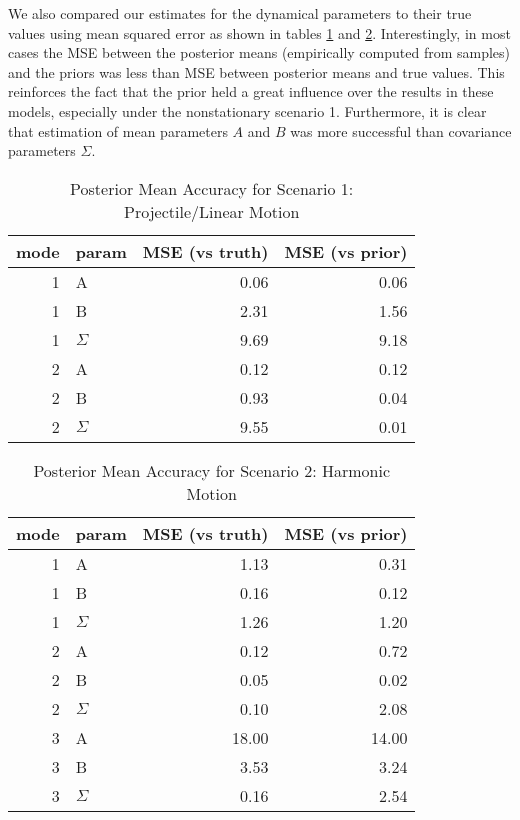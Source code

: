 \documentclass{article} %
\begin{document}
We also compared our estimates for the dynamical parameters to their true values using mean squared error as shown in tables \ref{tbl:scen1} and \ref{tbl:scen2}. Interestingly, in most cases the MSE between the posterior means (empirically computed from samples) and the priors was less than MSE between posterior means and true values. This reinforces the fact that the prior held a great influence over the results in these models, especially under the nonstationary scenario 1. Furthermore, it is clear that estimation of mean parameters $A$ and $B$ was more successful than covariance parameters $\Sigma$.

\begin{table}[]
\centering
\caption{Posterior Mean Accuracy for Scenario 1: Projectile/Linear Motion}
\label{tbl:scen1}
\begin{tabular}{rlrr}
\hline
mode & param & MSE (vs truth) & MSE (vs prior)\\ \hline
1 & A     & 0.06      & 0.06       \\
1 & B     & 2.31      & 1.56       \\
1 & $\Sigma$ & 9.69      & 9.18       \\
2 & A     & 0.12      & 0.12       \\
2 & B     & 0.93      & 0.04       \\
2 & $\Sigma$ & 9.55      & 0.01       \\ \hline
\end{tabular}
\end{table}

\begin{table}[]
\centering
\caption{Posterior Mean Accuracy for Scenario 2: Harmonic Motion}
\label{tbl:scen2}
\begin{tabular}{rlrr}
\hline
mode & param & MSE (vs truth) & MSE (vs prior) \\ \hline
1    & A     & 1.13      & 0.31       \\
1    & B     & 0.16      & 0.12       \\
1    & $\Sigma$ & 1.26      & 1.20       \\
2    & A     & 0.12      & 0.72       \\
2    & B     & 0.05      & 0.02       \\
2    & $\Sigma$ & 0.10      & 2.08       \\
3    & A     & 18.00     & 14.00      \\
3    & B     & 3.53      & 3.24       \\
3    & $\Sigma$ & 0.16      & 2.54       \\ \hline
\end{tabular}
\end{table}
\end{document}
